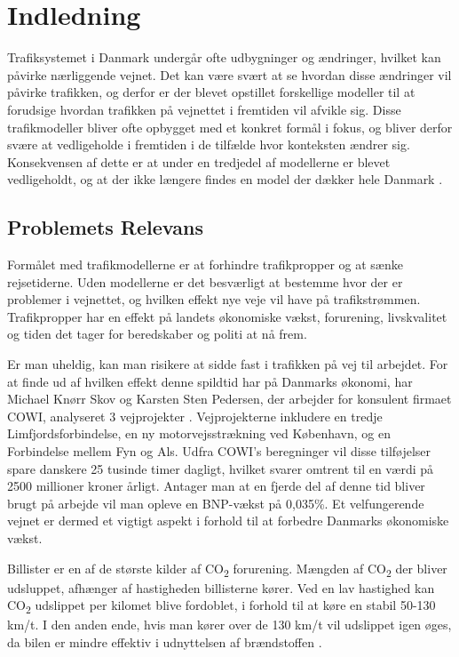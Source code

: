 \chapter{Indledning}\label{Indledning}
Trafiksystemet i Danmark undergår ofte udbygninger og ændringer, hvilket kan påvirke nærliggende vejnet. Det kan være svært at se hvordan disse ændringer vil påvirke trafikken, og derfor er der blevet opstillet forskellige modeller til at forudsige hvordan trafikken på vejnettet i fremtiden vil afvikle sig. Disse trafikmodeller bliver ofte opbygget med et konkret formål i fokus, og bliver derfor svære at vedligeholde i fremtiden i de tilfælde hvor konteksten ændrer sig. Konsekvensen af dette er at under en tredjedel af modellerne er blevet vedligeholdt, og at der ikke længere findes en model der dækker hele Danmark \cite[s. 1-2]{dtfnotat}.

\section{Problemets Relevans}
Formålet med trafikmodellerne er at forhindre trafikpropper og at sænke rejsetiderne. Uden modellerne er det besværligt at bestemme hvor der er problemer i vejnettet, og hvilken effekt nye veje vil have på trafikstrømmen. Trafikpropper har en effekt på landets økonomiske vækst, forurening, livskvalitet og tiden det tager for beredskaber og politi at nå frem.

\vspace{5mm}

Er man uheldig, kan man risikere at sidde fast i trafikken på vej til arbejdet. For at finde ud af hvilken effekt denne spildtid har på Danmarks økonomi, har Michael Knørr Skov og Karsten Sten Pedersen, der arbejder for konsulent firmaet COWI, analyseret 3 vejprojekter \cite{trafikoekonomi}. Vejprojekterne inkludere en tredje Limfjordsforbindelse, en ny motorvejsstrækning ved København, og en Forbindelse mellem Fyn og Als. Udfra COWI’s beregninger vil disse tilføjelser spare danskere 25 tusinde timer dagligt, hvilket svarer omtrent til en værdi på 2500 millioner kroner årligt. Antager man at en fjerde del af denne tid bliver brugt på arbejde vil man opleve en BNP-vækst på 0,035\%. Et velfungerende vejnet er dermed et vigtigt aspekt i forhold til at forbedre Danmarks økonomiske vækst. 

\vspace{5mm}

Billister er en af de største kilder af CO\textsubscript{2} forurening. Mængden af CO\textsubscript{2} der bliver udsluppet, afhænger af hastigheden billisterne kører. Ved en lav hastighed kan CO\textsubscript{2} udslippet per kilomet blive fordoblet, i forhold til at køre en stabil 50-130 km/t. I den anden ende, hvis man kører over de 130 km/t vil udslippet igen øges, da bilen er mindre effektiv i udnyttelsen af brændstoffen \cite[s. 5-6]{forurening}.

